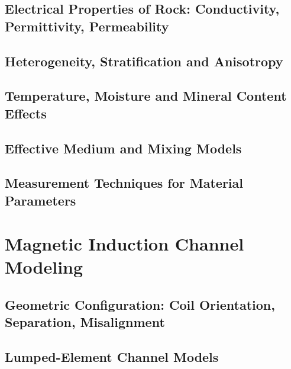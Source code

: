\subsection{Electrical Properties of Rock: Conductivity, Permittivity, Permeability}\label{subsec:rock-properties}

\subsection{Heterogeneity, Stratification and Anisotropy}\label{subsec:heterogeneity}

\subsection{Temperature, Moisture and Mineral Content Effects}\label{subsec:environmental-effects}

\subsection{Effective Medium and Mixing Models}\label{subsec:mixing-models}

\subsection{Measurement Techniques for Material Parameters}\label{subsec:material-measurement}

\section{Magnetic Induction Channel Modeling}\label{sec:channel-modeling}
\subsection{Geometric Configuration: Coil Orientation, Separation, Misalignment}\label{subsec:geometry}

\subsection{Lumped-Element Channel Models}\label{subsec:lumped-models}

